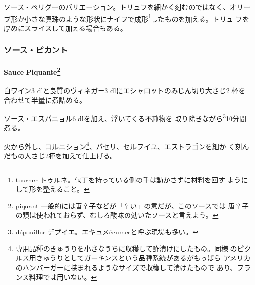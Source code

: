\begin{recette}

ソース・ペリグーのバリエーション。トリュフを細かく刻むのではなく、オリー
ブ形か小さな真珠のような形状にナイフで成形\footnote{tourner
  トゥルネ。包丁を持っている側の手は動かさずに材料を回す
  ようにして形を整えること。}したものを加える。トリュ
フを厚めにスライスして加える場合もある。

\maeaki

\hypertarget{ux30bdux30fcux30b9ux30d4ux30abux30f3ux30c8}{%
\subsubsection{ソース・ピカント}\label{ux30bdux30fcux30b9ux30d4ux30abux30f3ux30c8}}

\hypertarget{sauce-piquante}{%
\paragraph[Sauce Piquante]{\texorpdfstring{Sauce Piquante\footnote{piquant
  一般的には唐辛子などが「辛い」の意だが、このソースでは
  唐辛子の類は使われておらず、むしろ酸味の効いたソースと言えよう。}}{Sauce Piquante}}\label{sauce-piquante}}


白ワイン3 dlと良質のヴィネガー3 dlにエシャロットのみじん切り大さじ2
\undemi{}杯を合わせて半量に煮詰める。

\protect\hyperlink{sauce-espagnole}{ソース・エスパニョル}6
dlを加え、浮いてくる不純物を 取り除きながら\footnote{dépouiller
  デプイエ。エキュメécumerと呼ぶ現場も多い。}10分間煮る。

火から外し、コルニション\footnote{専用品種のきゅうりを小さなうちに収穫して酢漬けにしたもの。同様
  のピクルス用きゅうりとしてガーキンスという品種系統があるがもっぱら
  アメリカのハンバーガーに挟まれるようなサイズで収穫して漬けたもので
  あり、フランス料理では用いない。}、パセリ、セルフイユ、エストラゴンを細か
く刻んだもの大さじ2杯を加えて仕上げる。


\end{recette}
